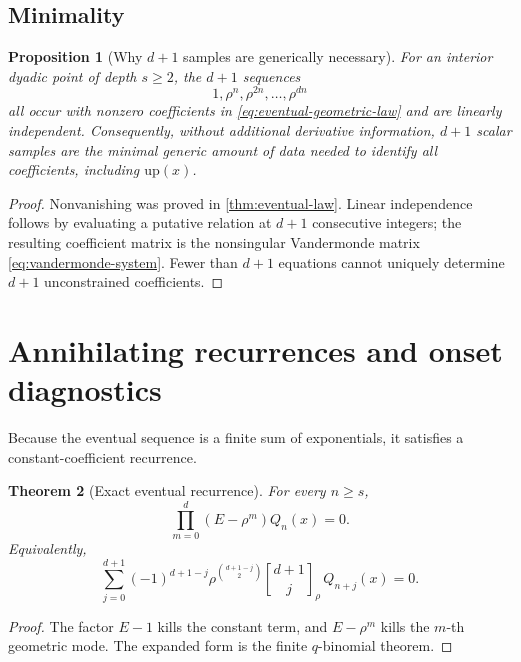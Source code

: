 \documentclass[11pt,oneside]{article}
\numberwithin{equation}{section}
\newtheorem{theorem}{Theorem}[section]
\newtheorem{proposition}[theorem]{Proposition}
\theoremstyle{definition}
\theoremstyle{remark}
\newcommand{\upf}{\mathrm{up}}
\newcommand{\qbinom}[3]{\genfrac{[}{]}{0pt}{}{#1}{#2}_{#3}}
\begin{document}
\subsection{Minimality}

\begin{proposition}[Why $d+1$ samples are generically necessary]
For an interior dyadic point of depth $s\ge2$, the $d+1$ sequences
\begin{equation}
 1,\rho^n,\rho^{2n},\ldots,\rho^{dn}
 \label{eq:basis-sequences}
\end{equation}
all occur with nonzero coefficients in \eqref{eq:eventual-geometric-law} and are
linearly independent.  Consequently, without additional derivative information,
$d+1$ scalar samples are the minimal generic amount of data needed to identify
all coefficients, including $\upf(x)$.
\end{proposition}

\begin{proof}
Nonvanishing was proved in \cref{thm:eventual-law}.  Linear independence follows
by evaluating a putative relation at $d+1$ consecutive integers; the resulting
coefficient matrix is the nonsingular Vandermonde matrix
\eqref{eq:vandermonde-system}.  Fewer than $d+1$ equations cannot uniquely
determine $d+1$ unconstrained coefficients.
\end{proof}

\section{Annihilating recurrences and onset diagnostics}

Because the eventual sequence is a finite sum of exponentials, it satisfies a
constant-coefficient recurrence.

\begin{theorem}[Exact eventual recurrence]
For every $n\ge s$,
\begin{equation}
 \boxed{\displaystyle
 \prod_{m=0}^{d}(E-\rho^m)Q_n(x)=0.}
 \label{eq:annihilator}
\end{equation}
Equivalently,
\begin{equation}
 \sum_{j=0}^{d+1}(-1)^{d+1-j}
 \rho^{\binom{d+1-j}{2}}
 \qbinom{d+1}{j}{\rho}\,Q_{n+j}(x)=0.
 \label{eq:expanded-recurrence}
\end{equation}
\end{theorem}

\begin{proof}
The factor $E-1$ kills the constant term, and $E-\rho^m$ kills the $m$-th
geometric mode.  The expanded form is the finite $q$-binomial theorem.
\end{proof}
\end{document}
